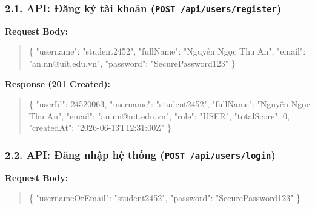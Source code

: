 \documentclass[12pt,a4paper]{article}
\renewcommand{\_}{\BreakableUnderscore}
\newenvironment{Shaded}{\vspace{3pt}\begin{quote}}{\end{quote}\vspace{3pt}}
\newcommand{\DataTypeTok}[1]{\textcolor[rgb]{0.56,0.13,0.00}{#1}}
\newcommand{\DecValTok}[1]{\textcolor[rgb]{0.25,0.63,0.44}{#1}}
\newcommand{\FunctionTok}[1]{\textcolor[rgb]{0.02,0.16,0.49}{#1}}
\newcommand{\StringTok}[1]{\textcolor[rgb]{0.25,0.44,0.63}{#1}}
\begin{document}
\subsubsection{\texorpdfstring{2.1. API: Đăng ký tài khoản (\texttt{POST\ /api/users/register})}{2.1. API: Đăng ký tài khoản (POST /api/users/register)}}

\textbf{Request Body:}

\begin{Shaded}
\begin{Highlighting}[]
\FunctionTok{\{}
  \DataTypeTok{"username"}\FunctionTok{:} \StringTok{"student2452"}\FunctionTok{,}
  \DataTypeTok{"fullName"}\FunctionTok{:} \StringTok{"Nguyễn Ngọc Thu An"}\FunctionTok{,}
  \DataTypeTok{"email"}\FunctionTok{:} \StringTok{"an.nn@uit.edu.vn"}\FunctionTok{,}
  \DataTypeTok{"password"}\FunctionTok{:} \StringTok{"SecurePassword123"}
\FunctionTok{\}}
\end{Highlighting}
\end{Shaded}

\textbf{Response (201 Created):}

\begin{Shaded}
\begin{Highlighting}[]
\FunctionTok{\{}
  \DataTypeTok{"userId"}\FunctionTok{:} \DecValTok{24520063}\FunctionTok{,}
  \DataTypeTok{"username"}\FunctionTok{:} \StringTok{"student2452"}\FunctionTok{,}
  \DataTypeTok{"fullName"}\FunctionTok{:} \StringTok{"Nguyễn Ngọc Thu An"}\FunctionTok{,}
  \DataTypeTok{"email"}\FunctionTok{:} \StringTok{"an.nn@uit.edu.vn"}\FunctionTok{,}
  \DataTypeTok{"role"}\FunctionTok{:} \StringTok{"USER"}\FunctionTok{,}
  \DataTypeTok{"totalScore"}\FunctionTok{:} \DecValTok{0}\FunctionTok{,}
  \DataTypeTok{"createdAt"}\FunctionTok{:} \StringTok{"2026{-}06{-}13T12:31:00Z"}
\FunctionTok{\}}
\end{Highlighting}
\end{Shaded}

\subsubsection{\texorpdfstring{2.2. API: Đăng nhập hệ thống (\texttt{POST\ /api/users/login})}{2.2. API: Đăng nhập hệ thống (POST /api/users/login)}}

\textbf{Request Body:}

\begin{Shaded}
\begin{Highlighting}[]
\FunctionTok{\{}
  \DataTypeTok{"usernameOrEmail"}\FunctionTok{:} \StringTok{"student2452"}\FunctionTok{,}
  \DataTypeTok{"password"}\FunctionTok{:} \StringTok{"SecurePassword123"}
\FunctionTok{\}}
\end{Highlighting}
\end{Shaded}
\end{document}
